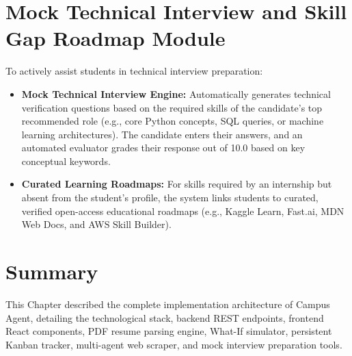 \section{Mock Technical Interview and Skill Gap Roadmap Module} \label{S5.9}
To actively assist students in technical interview preparation:
\begin{itemize}
	\item \textbf{Mock Technical Interview Engine:} Automatically generates technical verification questions based on the required skills of the candidate's top recommended role (e.g., core Python concepts, SQL queries, or machine learning architectures). The candidate enters their answers, and an automated evaluator grades their response out of 10.0 based on key conceptual keywords.
	\item \textbf{Curated Learning Roadmaps:} For skills required by an internship but absent from the student's profile, the system links students to curated, verified open-access educational roadmaps (e.g., Kaggle Learn, Fast.ai, MDN Web Docs, and AWS Skill Builder).
\end{itemize}

\section{Summary} \label{S5.10}
This Chapter described the complete implementation architecture of Campus Agent, detailing the technological stack, backend REST endpoints, frontend React components, PDF resume parsing engine, What-If simulator, persistent Kanban tracker, multi-agent web scraper, and mock interview preparation tools.
